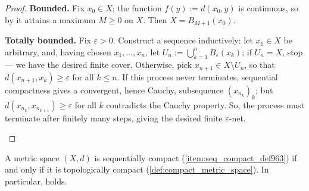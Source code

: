 \begin{proof}
\textbf{Bounded.} Fix $x_0 \in X$; the function $f(y) := d(x_0,y)$ is continuous, so by
 it attains a maximum $M \geq 0$ on $X$. Then
$X = B_{M+1}(x_0)$.

\textbf{Totally bounded.} Fix $\varepsilon > 0$. Construct a sequence inductively: let
$x_1 \in X$ be arbitrary, and, having chosen $x_1,\dots,x_n$, let
$U_n := \bigcup_{k=1}^n B_\varepsilon(x_k)$; if $U_n = X$, stop --- we have the desired finite
cover. Otherwise, pick $x_{n+1} \in X\setminus U_n$, so that $d(x_{n+1},x_k) \geq \varepsilon$ for
all $k \leq n$. If this process never terminates, sequential compactness gives a convergent, hence
Cauchy, subsequence $(x_{n_k})_k$; but $d(x_{n_k},x_{n_{k+1}}) \geq \varepsilon$ for all $k$
contradicts the Cauchy property. So, the process must terminate after finitely many steps, giving
the desired finite $\varepsilon$-net.

\begin{center}
\end{center}
\end{proof}

\begin{theorem}
\label{thm:sequential_topological_compactness_equivalence}
A metric space $(X,d)$ is sequentially compact (\cref{item:seq_compact_def963}) if and only if it
is topologically compact (\cref{def:compact_metric_space}). In particular,
 holds.
\end{theorem}

